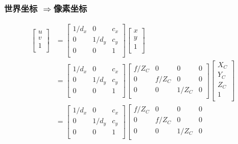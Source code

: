 \documentclass[aspectratio=43]{beamer}
\begin{document}
\begin{frame}
	\frametitle{世界坐标 $\Rightarrow$像素坐标}
	\begin{small}
		\begin{equation*}
			\begin{aligned}
\left[ \begin{array}{c}
	u\\
	v\\
	1\\
\end{array} \right] &=\left[ \begin{matrix}
	1/d_x&		0&		c_x\\
	0&		1/d_y&		c_y\\
	0&		0&		1\\
\end{matrix} \right] \left[ \begin{array}{c}
	x\\
	y\\
	1\\
\end{array} \right] 
\\
&=\left[ \begin{matrix}
	1/d_x&		0&		c_x\\
	0&		1/d_y&		c_y\\
	0&		0&		1\\
\end{matrix} \right] \left[ \begin{matrix}
	f/Z_C&		0&		0&		0\\
	0&		f/Z_C&		0&		0\\
	0&		0&		1/Z_C&		0\\
\end{matrix} \right] \left[ \begin{array}{c}
	X_C\\
	Y_C\\
	Z_C\\
	1\\
\end{array} \right] 
\\
&=\left[ \begin{matrix}
	1/d_x&		0&		c_x\\
	0&		1/d_y&		c_y\\
	0&		0&		1\\
\end{matrix} \right] \left[ \begin{matrix}
	f/Z_C&		0&		0&		0\\
	0&		f/Z_C&		0&		0\\
	0&		0&		1/Z_C&		0\\

\end{matrix}
\end{aligned}
\end{equation*}
\end{small}
\end{frame}
\end{document}
